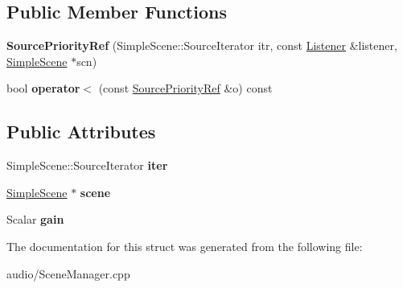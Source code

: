 \subsection*{Public Member Functions}
\begin{DoxyCompactItemize}
\item 
{\bfseries Source\+Priority\+Ref} (Simple\+Scene\+::\+Source\+Iterator itr, const \hyperlink{classAudio_1_1Listener}{Listener} \&listener, \hyperlink{classAudio_1_1SimpleScene}{Simple\+Scene} $\ast$scn)\hypertarget{structAudio_1_1SourcePriorityRef_af1aff95a33616835be2191ab0136764b}{}\label{structAudio_1_1SourcePriorityRef_af1aff95a33616835be2191ab0136764b}

\item 
bool {\bfseries operator$<$} (const \hyperlink{structAudio_1_1SourcePriorityRef}{Source\+Priority\+Ref} \&o) const \hypertarget{structAudio_1_1SourcePriorityRef_ae78ab557eb3c7aab2c4cee7148f88f89}{}\label{structAudio_1_1SourcePriorityRef_ae78ab557eb3c7aab2c4cee7148f88f89}

\end{DoxyCompactItemize}
\subsection*{Public Attributes}
\begin{DoxyCompactItemize}
\item 
Simple\+Scene\+::\+Source\+Iterator {\bfseries iter}\hypertarget{structAudio_1_1SourcePriorityRef_aed5006eb807b83e88b0ecf1261afcfe3}{}\label{structAudio_1_1SourcePriorityRef_aed5006eb807b83e88b0ecf1261afcfe3}

\item 
\hyperlink{classAudio_1_1SimpleScene}{Simple\+Scene} $\ast$ {\bfseries scene}\hypertarget{structAudio_1_1SourcePriorityRef_ac05af6df9e594171eb8ecdc09f16db22}{}\label{structAudio_1_1SourcePriorityRef_ac05af6df9e594171eb8ecdc09f16db22}

\item 
Scalar {\bfseries gain}\hypertarget{structAudio_1_1SourcePriorityRef_acdbc042261543aa0a6f9d6bc0ac323c6}{}\label{structAudio_1_1SourcePriorityRef_acdbc042261543aa0a6f9d6bc0ac323c6}

\end{DoxyCompactItemize}


The documentation for this struct was generated from the following file\+:\begin{DoxyCompactItemize}
\item 
audio/Scene\+Manager.\+cpp\end{DoxyCompactItemize}
